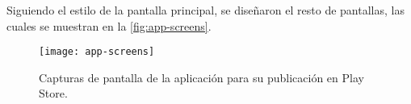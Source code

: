 Siguiendo el estilo de la pantalla principal, se diseñaron el resto de pantallas, las cuales se muestran en la \autoref{fig:app-screens}.

\newpage


\begin{landscape}
	\begin{figure}[H]
		\centering
		\texttt{[image: app-screens]}
		\vspace{-0.5cm}
		\caption[Aplicación en Google Play.]{Capturas de pantalla de la aplicación para su publicación en Play Store.}
	    \label{fig:app-screens}
	\end{figure}
\end{landscape}
